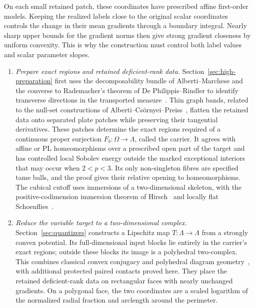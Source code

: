\documentclass[11pt]{article}
\numberwithin{equation}{section}
\theoremstyle{definition}
\theoremstyle{remark}
\begin{document}
On each small retained patch, these coordinates have prescribed affine
first-order models.  Keeping the realized labels close to the original
scalar coordinates controls the change in their mean gradients through
a boundary integral.  Nearly
sharp upper bounds for the gradient norms then give strong gradient
closeness by uniform convexity.  This is why the construction must
control both label values and scalar parameter slopes.

\begin{enumerate}
\item \emph{Prepare exact regions and retained deficient-rank data.}
Section~\ref{sec:high-preparation} first uses the decomposability bundle
of Alberti--Marchese and the converse to Rademacher's theorem of
De Philippis--Rindler to identify transverse directions in the transported
measure~\cite{AlbertiMarchese2016,DePhilippisRindler2016}.
Thin graph bands, related to the null-set constructions of
Alberti--Cs\"ornyei--Preiss~\cite{AlbertiCsornyeiPreiss2010}, flatten
the retained data onto separated plate patches while preserving
their tangential derivatives.  These patches determine the exact
regions required of a continuous proper surjection
$F_b:\Omega\to\Lambda$, called the carrier.  It agrees with affine
or PL homeomorphisms over a prescribed open part of the target and
has controlled local Sobolev energy outside the marked exceptional
interiors that may occur when $2<p<3$.  Its only non-singleton fibres
are specified tame balls, and the proof gives their relative opening
to homeomorphisms.  The cubical cutoff uses immersions of a
two-dimensional skeleton, with the positive-codimension immersion
theorem of Hirsch~\cite{Hirsch1959} and locally flat
Schoenflies~\cite{Brown1960}.

\item \emph{Reduce the variable target to a two-dimensional complex.}
Section~\ref{sec:quantizers} constructs a Lipschitz map
$T:\Lambda\to\Lambda$ from a strongly convex potential.
Its full-dimensional input blocks lie entirely in the carrier's exact
regions; outside these blocks its image is a polyhedral two-complex.
This combines classical convex conjugacy and polyhedral diagram
geometry~\cite{Moreau1965,Aurenhammer1987}, with additional protected
paired contacts proved here.  They place the retained deficient-rank
data on rectangular faces with nearly unchanged gradients.
On a polygonal face, the two coordinates are a scaled logarithm of
the normalized radial fraction and arclength around the perimeter.


\end{enumerate}
\end{document}
